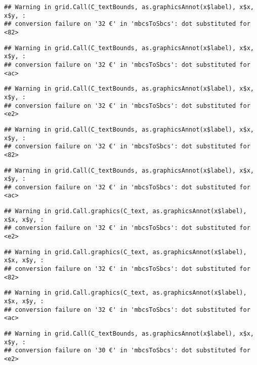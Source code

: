 \documentclass[
]{article}
\begin{document}
\begin{verbatim}
## Warning in grid.Call(C_textBounds, as.graphicsAnnot(x$label), x$x, x$y, :
## conversion failure on '32 €' in 'mbcsToSbcs': dot substituted for <82>
\end{verbatim}

\begin{verbatim}
## Warning in grid.Call(C_textBounds, as.graphicsAnnot(x$label), x$x, x$y, :
## conversion failure on '32 €' in 'mbcsToSbcs': dot substituted for <ac>
\end{verbatim}

\begin{verbatim}
## Warning in grid.Call(C_textBounds, as.graphicsAnnot(x$label), x$x, x$y, :
## conversion failure on '32 €' in 'mbcsToSbcs': dot substituted for <e2>
\end{verbatim}

\begin{verbatim}
## Warning in grid.Call(C_textBounds, as.graphicsAnnot(x$label), x$x, x$y, :
## conversion failure on '32 €' in 'mbcsToSbcs': dot substituted for <82>
\end{verbatim}

\begin{verbatim}
## Warning in grid.Call(C_textBounds, as.graphicsAnnot(x$label), x$x, x$y, :
## conversion failure on '32 €' in 'mbcsToSbcs': dot substituted for <ac>
\end{verbatim}

\begin{verbatim}
## Warning in grid.Call.graphics(C_text, as.graphicsAnnot(x$label), x$x, x$y, :
## conversion failure on '32 €' in 'mbcsToSbcs': dot substituted for <e2>
\end{verbatim}

\begin{verbatim}
## Warning in grid.Call.graphics(C_text, as.graphicsAnnot(x$label), x$x, x$y, :
## conversion failure on '32 €' in 'mbcsToSbcs': dot substituted for <82>
\end{verbatim}

\begin{verbatim}
## Warning in grid.Call.graphics(C_text, as.graphicsAnnot(x$label), x$x, x$y, :
## conversion failure on '32 €' in 'mbcsToSbcs': dot substituted for <ac>
\end{verbatim}

\begin{verbatim}
## Warning in grid.Call(C_textBounds, as.graphicsAnnot(x$label), x$x, x$y, :
## conversion failure on '30 €' in 'mbcsToSbcs': dot substituted for <e2>
\end{verbatim}
\end{document}
